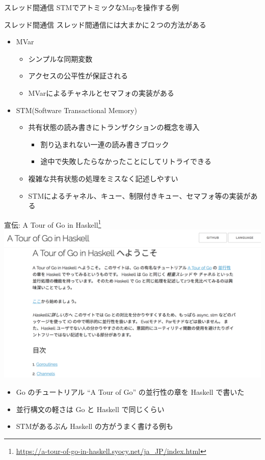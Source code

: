 \documentclass[unicode,12pt]{beamer}
\begin{document}
\begin{frame}{スレッド間通信}
  STMでアトミックなMapを操作する例
  
\end{frame}

\begin{frame}{スレッド間通信}
  スレッド間通信には大まかに２つの方法がある
  \begin{itemize}
  \item MVar
    \begin{itemize}
    \item シンプルな同期変数
    \item アクセスの\alert{公平性}が保証される
    \item MVarによるチャネルとセマフォの実装がある
    \end{itemize}
  \item STM(Software Transactional Memory)
    \begin{itemize}
    \item 共有状態の読み書きに\alert{トランザクション}の概念を導入
      \begin{itemize}
      \item 割り込まれない一連の読み書きブロック
      \item 途中で失敗したらなかったことにしてリトライできる
      \end{itemize}
      \item 複雑な共有状態の処理をミスなく記述しやすい
    \item STMによるチャネル、キュー、制限付きキュー、セマフォ等の実装がある
    \end{itemize}
  \end{itemize}
\end{frame}

\begin{frame}{宣伝: A Tour of Go in Haskell\footnote{\url{https://a-tour-of-go-in-haskell.syocy.net/ja_JP/index.html}}}
  \centering
  \includegraphics[width=.55\textwidth]{pic/a_tour_of_go_in_haskell.png}
  \begin{itemize}
  \item Go のチュートリアル ``A Tour of Go'' の並行性の章を Haskell で書いた
  \item 並行構文の軽さは Go と Haskell で同じくらい
  \item STMがあるぶん Haskell の方がうまく書ける例も
  \end{itemize}
\end{frame}
\end{document}

